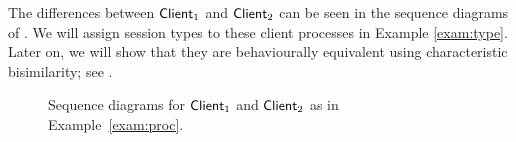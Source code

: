 \begin{example}
%
%
%

The differences between $\mathsf{Client}_1$ and $\mathsf{Client}_2$ can be  seen in the sequence diagrams of . 
We will assign session types to these client processes in Example \ref{exam:type}.
Later on, we will show that they are behaviourally equivalent using characteristic bisimilarity;
see .
\begin{figure}

\caption{Sequence diagrams for $\mathsf{Client}_1$ and $\mathsf{Client}_2$ as in Example~\ref{exam:proc}\label{fig:exam}.}
\end{figure}
\end{example}
